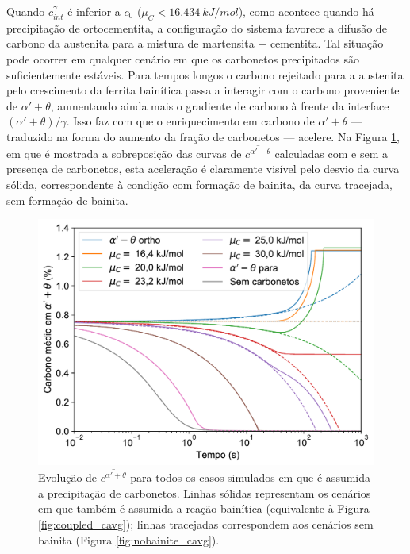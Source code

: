 Quando $c^\gamma_{int}$ é inferior a $c_0$ ($\mu_C < \SI{16.434}{kJ/mol}$), como acontece quando há precipitação de ortocementita, a configuração do sistema favorece a difusão de carbono da austenita para a mistura de martensita + cementita. Tal situação pode ocorrer em qualquer cenário em que os carbonetos precipitados são suficientemente estáveis. Para tempos longos o carbono rejeitado para a austenita pelo crescimento da ferrita bainítica passa a interagir com o carbono proveniente de $\alpha' + \theta$, aumentando ainda mais o gradiente de carbono à frente da interface $(\alpha' + \theta)/\gamma$. Isso faz com que o enriquecimento em carbono de $\alpha' + \theta$ --- traduzido na forma do aumento da fração de carbonetos --- acelere. Na Figura \ref{fig:all_cavg}, em que é mostrada a sobreposição das curvas de $\overline{c^{\alpha' + \theta}}$ calculadas com e sem a presença de carbonetos, esta aceleração é claramente visível pelo desvio da curva sólida, correspondente à condição com formação de bainita, da curva tracejada, sem formação de bainita.

\begin{figure}
  \includegraphics[height=.6\textwidth]{img/cpartition/all_cavg.pdf}
  \caption{Evolução de $\overline{c^{\alpha' + \theta}}$ para todos os casos simulados em que é assumida a precipitação de carbonetos. Linhas sólidas representam os cenários em que também é assumida a reação bainítica (equivalente à Figura \ref{fig:coupled_cavg}); linhas tracejadas correspondem aos cenários sem bainita (Figura \ref{fig:nobainite_cavg}).}
  \label{fig:all_cavg}
\end{figure}

